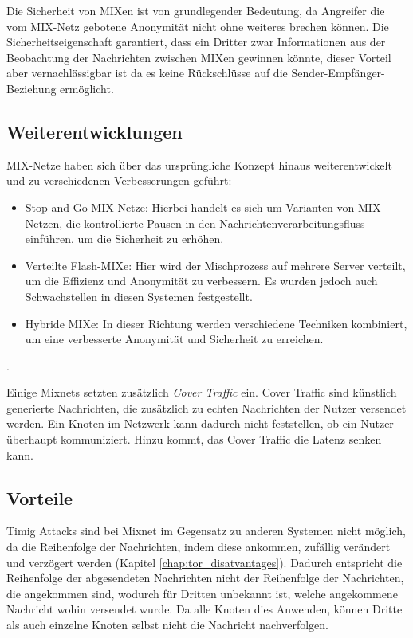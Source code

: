 Die Sicherheit von MIXen ist von grundlegender Bedeutung, da Angreifer die vom MIX-Netz gebotene Anonymität nicht ohne weiteres brechen können. Die Sicherheitseigenschaft garantiert, dass ein Dritter zwar Informationen aus der Beobachtung der Nachrichten zwischen MIXen gewinnen könnte, dieser Vorteil aber vernachlässigbar ist da es keine Rückschlüsse auf die Sender-Empfänger-Beziehung ermöglicht.

\subsection{Weiterentwicklungen}
\label{chap:mixnet_enhancements}

MIX-Netze haben sich über das ursprüngliche Konzept hinaus weiterentwickelt und zu verschiedenen Verbesserungen geführt:

\begin{itemize}
    \item Stop-and-Go-MIX-Netze: Hierbei handelt es sich um Varianten von MIX-Netzen, die kontrollierte Pausen in den Nachrichtenverarbeitungsfluss einführen, um die Sicherheit zu erhöhen.
    \item Verteilte \glqq Flash-MIXe\grqq: Hier wird der Mischprozess auf mehrere Server verteilt, um die Effizienz und Anonymität zu verbessern. Es wurden jedoch auch Schwachstellen in diesen Systemen festgestellt.
    \item Hybride MIXe: In dieser Richtung werden verschiedene Techniken kombiniert, um eine verbesserte Anonymität und Sicherheit zu erreichen\cite{MIXNetReliability}.
\end{itemize}.

Einige Mixnets setzten zusätzlich \textit{Cover Traffic} ein. Cover Traffic sind künstlich generierte Nachrichten, die zusätzlich zu echten Nachrichten der Nutzer versendet werden. Ein Knoten im Netzwerk kann dadurch nicht feststellen, ob ein Nutzer überhaupt kommuniziert. Hinzu kommt, das Cover Traffic die Latenz senken kann\cite{MixnetOptimizationMethods}.

\subsection{Vorteile}
\label{chap:mixnet_advantages}

Timig Attacks sind bei Mixnet im Gegensatz zu anderen Systemen nicht möglich, da die Reihenfolge der Nachrichten, indem diese ankommen, zufällig verändert und verzögert werden (Kapitel \ref{chap:tor_disatvantages}). Dadurch entspricht die Reihenfolge der abgesendeten Nachrichten nicht der Reihenfolge der Nachrichten, die angekommen sind, wodurch für Dritten unbekannt ist, welche angekommene Nachricht wohin versendet wurde. Da alle Knoten dies Anwenden, können Dritte als auch einzelne Knoten selbst nicht die Nachricht nachverfolgen\cite{MixNetworksSecureApplications}.


